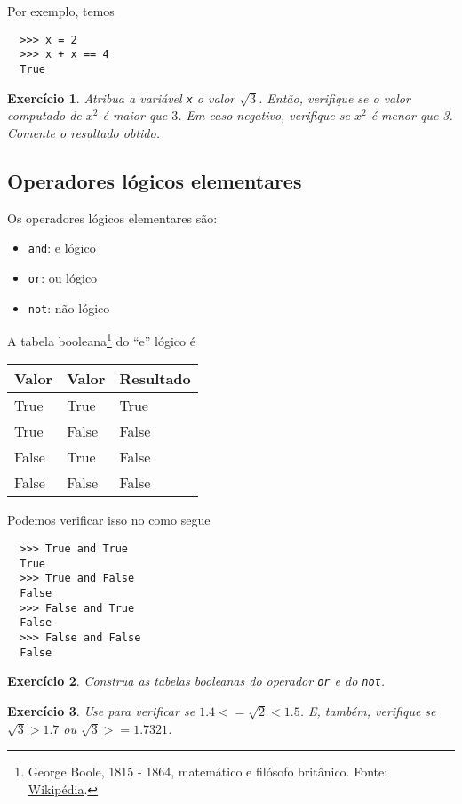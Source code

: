 \documentclass[12pt]{article}
\newtheorem{exr}{Exercício}[section]
\begin{document}
Por exemplo, temos
\begin{lstlisting}
  >>> x = 2
  >>> x + x == 4
  True
\end{lstlisting}

\begin{exr}
  Atribua a variável \lstinline+x+ o valor $\sqrt{3}$. Então, verifique se o valor computado de $x^2$ é maior que $3$. Em caso negativo, verifique se $x^2$ é menor que 3. Comente o resultado obtido.
\end{exr}

\subsection{Operadores lógicos elementares}

Os operadores lógicos elementares são:
\begin{itemize}
\item[]\lstinline+and+: e lógico
\item[]\lstinline+or+: ou lógico
\item[]\lstinline+not+: não lógico
\end{itemize}

A tabela booleana\footnote{George Boole, 1815 - 1864, matemático e filósofo britânico. Fonte: \href{https://pt.wikipedia.org/wiki/George\_Boole}{Wikipédia}.} do ``e'' lógico é
\begin{center}
  \begin{tabular}[H]{ll|l}
    Valor & Valor & Resultado \\\hline
    True & True & True \\
    True & False & False \\
    False & True & False \\
    False & False & False \\\hline
  \end{tabular}
\end{center}
Podemos verificar isso no {\python} como segue
\begin{lstlisting}
  >>> True and True
  True
  >>> True and False
  False
  >>> False and True
  False
  >>> False and False
  False
\end{lstlisting}

\begin{exr}
  Construa as tabelas booleanas do operador \lstinline+or+ e do \lstinline+not+.
\end{exr}

\begin{exr}
  Use {\python} para verificar se $1.4 <= \sqrt{2} < 1.5$. E, também, verifique se $\sqrt{3} > 1.7$ ou $\sqrt{3} >= 1.7321$.
\end{exr}
\end{document}
